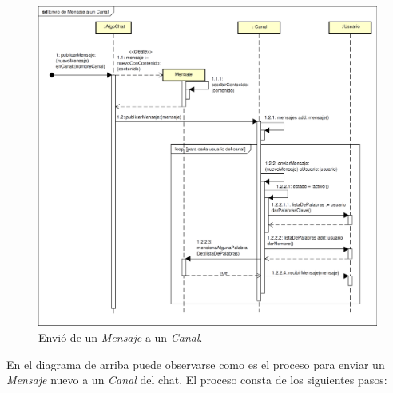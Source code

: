 \documentclass[titlepage,a4paper]{article}
\begin{document}
\begin{figure}[H]
\centering
\includegraphics[width=1\textwidth]{diagrama_secuencia01.png}
\caption{\label{fig:seq01}Envió de un \textit{Mensaje} a un \textit{Canal}.}
\end{figure}

En el diagrama de arriba puede observarse como es el proceso para enviar un \textit{Mensaje} nuevo a un \textit{Canal} del chat. El proceso consta de los siguientes pasos:
\end{document}
